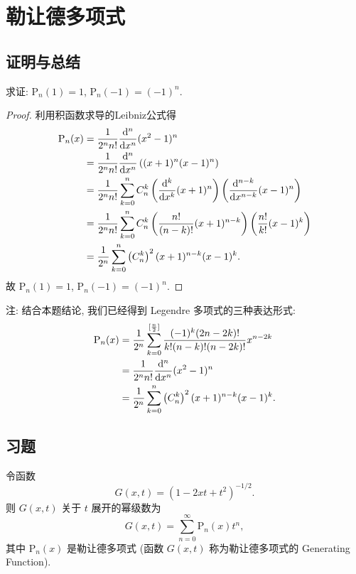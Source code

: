 \section{勒让德多项式}



\subsection{证明与总结}


求证: $\mathrm{P}_n(1)=1$, $\mathrm{P}_n(-1)=(-1)^n$.

\begin{proof}
利用积函数求导的Leibniz公式得
  \begin{align*}
  \mathrm{P}_n(x)&=\frac{1}{2^nn!}\frac{\diff^n}{\diff x^n}(x^2-1)^n\\
  &=\frac{1}{2^nn!}\frac{\diff^n}{\diff x^n}\left((x+1)^n(x-1)^n\right)\\
  &=\frac{1}{2^nn!}\sum_{k=0}^nC_n^k\left(\frac{\diff^k}{\diff x^k}(x+1)^n\right)\left(\frac{\diff^{n-k}}{\diff x^{n-k}}(x-1)^n\right)\\
  &=\frac{1}{2^nn!}\sum_{k=0}^nC_n^k\left(\frac{n!}{(n-k)!}(x+1)^{n-k}\right)\left(\frac{n!}{k!}(x-1)^k\right)\\
  &=\frac{1}{2^n}\sum_{k=0}^n\left(C_n^k\right)^2(x+1)^{n-k}(x-1)^k.
  \end{align*}
  故 $\mathrm{P}_n(1)=1$, $\mathrm{P}_n(-1)=(-1)^n$.
\end{proof}

注: 结合本题结论, 我们已经得到 Legendre 多项式的三种表达形式:\raggedbottom
\begin{align*}
  \mathrm{P}_n(x) 
  & = \frac{1}{2^n}\sum_{k=0}^{[\frac{n}{2}]}\frac{(-1)^k(2n-2k)!}{k!(n-k)!(n-2k)!}x^{n-2k} \\
  & = \frac{1}{2^nn!}\frac{\mathop{}\!\mathrm{d}^n}{\mathop{}\!\mathrm{d} x^n}(x^2-1)^n \\
  & = \frac{1}{2^n}\sum_{k=0}^n\left(C_n^k\right)^2(x+1)^{n-k}(x-1)^k.
\end{align*}


\subsection{习题}



\begin{exercise}
  令函数
  \[G(x,t)=(1-2xt+t^2)^{-1/2}.\]
  则 $G(x,t)$ 关于 $t$ 展开的幂级数为
  \[G(x,t)=\sum_{n=0}^{\infty}\mathrm{P}_n(x)t^n,\]
  其中 $\mathrm{P}_n(x)$ 是勒让德多项式 (函数 $G(x,t)$ 称为勒让德多项式的 Generating Function).
\end{exercise}

